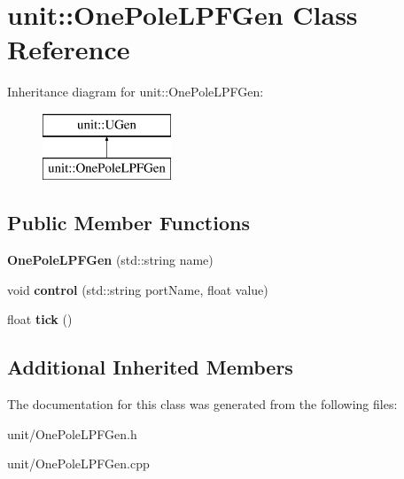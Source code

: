 \hypertarget{classunit_1_1OnePoleLPFGen}{}\section{unit\+:\+:One\+Pole\+L\+P\+F\+Gen Class Reference}
\label{classunit_1_1OnePoleLPFGen}
Inheritance diagram for unit\+:\+:One\+Pole\+L\+P\+F\+Gen\+:\begin{figure}[H]
\begin{center}
\leavevmode
\includegraphics[height=2.000000cm]{classunit_1_1OnePoleLPFGen}
\end{center}
\end{figure}
\subsection*{Public Member Functions}
\begin{DoxyCompactItemize}
\item 
{\bfseries One\+Pole\+L\+P\+F\+Gen} (std\+::string name)\hypertarget{classunit_1_1OnePoleLPFGen_aea39a9562852ac47fdd576fd8b583b9f}{}\label{classunit_1_1OnePoleLPFGen_aea39a9562852ac47fdd576fd8b583b9f}

\item 
void {\bfseries control} (std\+::string port\+Name, float value)\hypertarget{classunit_1_1OnePoleLPFGen_a8f2df9b7406edadf7dc34e7e65b2b67c}{}\label{classunit_1_1OnePoleLPFGen_a8f2df9b7406edadf7dc34e7e65b2b67c}

\item 
float {\bfseries tick} ()\hypertarget{classunit_1_1OnePoleLPFGen_a5e5288841ff8112113f2d6ec1f03f375}{}\label{classunit_1_1OnePoleLPFGen_a5e5288841ff8112113f2d6ec1f03f375}

\end{DoxyCompactItemize}
\subsection*{Additional Inherited Members}


The documentation for this class was generated from the following files\+:\begin{DoxyCompactItemize}
\item 
unit/One\+Pole\+L\+P\+F\+Gen.\+h\item 
unit/One\+Pole\+L\+P\+F\+Gen.\+cpp\end{DoxyCompactItemize}
